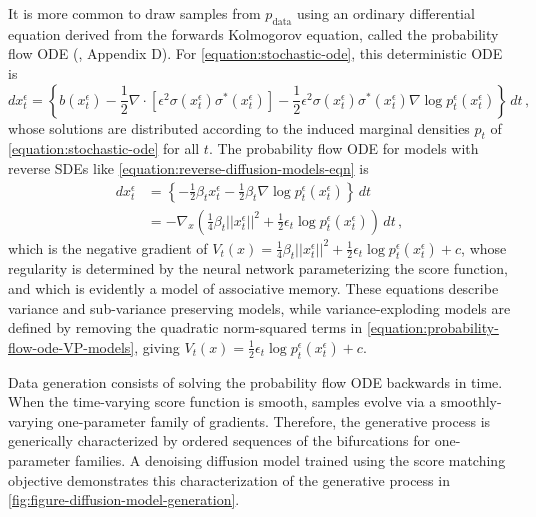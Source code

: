 \documentclass[12pt]{article}
\newcommand\colorAutoref[1]{{\hypersetup{linkcolor=blue}\autoref{#1}}}  %
\begin{document}
It is more common to draw samples from $p_{\text{data}}$ using an ordinary differential equation derived from the forwards Kolmogorov equation, called the probability flow ODE (\cite{song2020score}, Appendix D). For \eqref{equation:stochastic-ode}, this deterministic ODE is
\begin{equation}
\label{equation:probability-flow-ode}
    d{x_t^{\epsilon}} =  \left\{ b(x_t^{\epsilon}) - \frac{1}{2}\nabla \cdot \left[ \epsilon^2 \sigma(x_t^{\epsilon})\sigma^*(x_t^{\epsilon}) \right] - \frac{1}{2}\epsilon^2\sigma(x_t^{\epsilon})\sigma^*(x_t^{\epsilon}) \nabla \log p^{\epsilon}_t(x_t^{\epsilon})\right\}\,dt \, ,
\end{equation}
whose solutions are distributed according to the induced marginal densities $p_t$ of \eqref{equation:stochastic-ode} for all $t$. The probability flow ODE for models with reverse SDEs like \eqref{equation:reverse-diffusion-models-eqn} is
\begin{align}
\label{equation:probability-flow-ode-VP-models}
    d{x_t^{\epsilon}} &=  \left\{ -\frac{1}{2}\beta_t x^{\epsilon}_t  - \frac{1}{2}\beta_t \nabla \log p^{\epsilon}_t(x_t^{\epsilon})\right\}\,dt  \nonumber \\
    &=-  \nabla_x \left( \frac{1}{4} \beta_t||x^{\epsilon}_t||^2 + \frac{1}{2} \epsilon_t \log p^{\epsilon}_t(x^{\epsilon}_t) \right) \, dt \, ,
\end{align}
which is the negative gradient of $V_t(x) =  \frac{1}{4} \beta_t ||x^{\epsilon}_t||^2 + \frac{1}{2} \epsilon_t \log p^{\epsilon}_t(x^{\epsilon}_t)  + c $, whose regularity is determined by the neural network parameterizing the score function, and which is evidently a model of associative memory. These equations describe variance and sub-variance preserving models, while variance-exploding models are defined by removing the quadratic norm-squared terms in \eqref{equation:probability-flow-ode-VP-models}, giving $V_t(x) =\frac{1}{2} \epsilon_t \log p^{\epsilon}_t(x^{\epsilon}_t)  + c $.

Data generation consists of solving the probability flow ODE backwards in time. When the time-varying score function is smooth, samples evolve via a smoothly-varying one-parameter family of gradients. Therefore, the generative process is generically characterized by ordered sequences of the bifurcations for one-parameter families. A denoising diffusion model trained using the score matching objective demonstrates this characterization of the generative process in \colorAutoref{fig:figure-diffusion-model-generation}.
\end{document}
